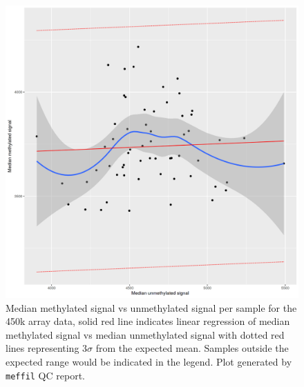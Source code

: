 \documentclass[
]{book}
\begin{document}
\begin{figure}

{\centering \includegraphics[width=0.8\linewidth]{figs/MAVIDOSqc450kmethVsUnmeth} 

}

\caption{Median methylated signal vs unmethylated signal per sample for the 450k array data, solid red line indicates linear regression of median methylated signal vs median unmethylated signal with dotted red lines representing \(3\sigma\) from the expected mean. Samples outside the expected range would be indicated in the legend. Plot generated by \texttt{meffil} QC report.}\label{fig:MAVIDOSqc450kmethVsUnmeth}
\end{figure}
\end{document}
